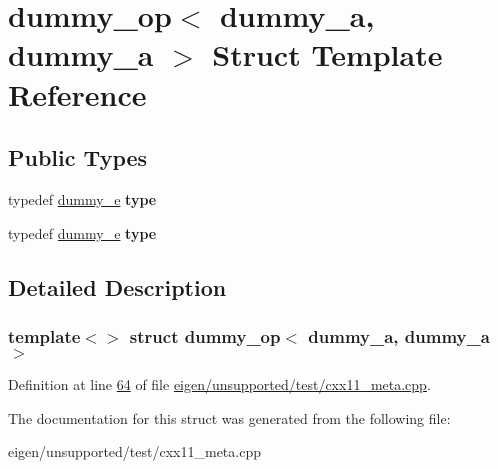 \hypertarget{structdummy__op_3_01dummy__a_00_01dummy__a_01_4}{}\section{dummy\+\_\+op$<$ dummy\+\_\+a, dummy\+\_\+a $>$ Struct Template Reference}
\label{structdummy__op_3_01dummy__a_00_01dummy__a_01_4}
\subsection*{Public Types}
\begin{DoxyCompactItemize}
\item 
\mbox{\label{structdummy__op_3_01dummy__a_00_01dummy__a_01_4_ac414221d807383851857602e4ddfe496}} 
typedef \hyperlink{structdummy__e}{dummy\+\_\+e} {\bfseries type}
\item 
\mbox{\label{structdummy__op_3_01dummy__a_00_01dummy__a_01_4_ac414221d807383851857602e4ddfe496}} 
typedef \hyperlink{structdummy__e}{dummy\+\_\+e} {\bfseries type}
\end{DoxyCompactItemize}


\subsection{Detailed Description}
\subsubsection*{template$<$$>$\newline
struct dummy\+\_\+op$<$ dummy\+\_\+a, dummy\+\_\+a $>$}



Definition at line \hyperlink{eigen_2unsupported_2test_2cxx11__meta_8cpp_source_l00064}{64} of file \hyperlink{eigen_2unsupported_2test_2cxx11__meta_8cpp_source}{eigen/unsupported/test/cxx11\+\_\+meta.\+cpp}.



The documentation for this struct was generated from the following file\+:\begin{DoxyCompactItemize}
\item 
eigen/unsupported/test/cxx11\+\_\+meta.\+cpp\end{DoxyCompactItemize}
